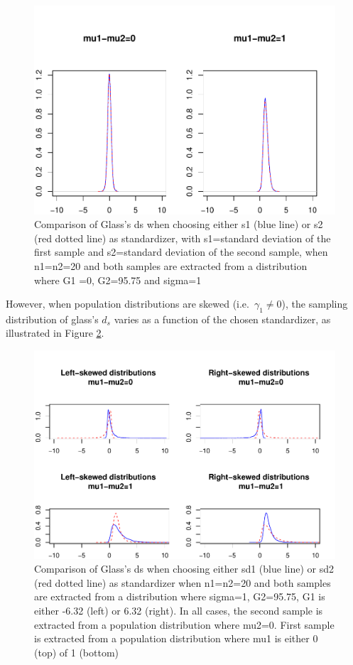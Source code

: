 \documentclass[
  man,floatsintext]{apa6}
\begin{document}
\begin{figure}
\centering
\includegraphics{Mathematical-study-of-Glass-s-d_files/figure-latex/glass1-1.pdf}
\caption{\label{fig:glass1}Comparison of Glass's ds when choosing either s1 (blue line) or s2 (red dotted line) as standardizer, with s1=standard deviation of the first sample and s2=standard deviation of the second sample, when n1=n2=20 and both samples are extracted from a distribution where G1 =0, G2=95.75 and sigma=1}
\end{figure}

However, when population distributions are skewed (i.e.~\(\gamma_1 \neq 0\)), the sampling distribution of glass's \(d_s\) varies as a function of the chosen standardizer, as illustrated in Figure \ref{fig:glass2}.

\begin{figure}
\centering
\includegraphics{Mathematical-study-of-Glass-s-d_files/figure-latex/glass2-1.pdf}
\caption{\label{fig:glass2}Comparison of Glass's ds when choosing either sd1 (blue line) or sd2 (red dotted line) as standardizer when n1=n2=20 and both samples are extracted from a distribution where sigma=1, G2=95.75, G1 is either -6.32 (left) or 6.32 (right). In all cases, the second sample is extracted from a population distribution where mu2=0. First sample is extracted from a population distribution where mu1 is either 0 (top) of 1 (bottom)}
\end{figure}
\end{document}
